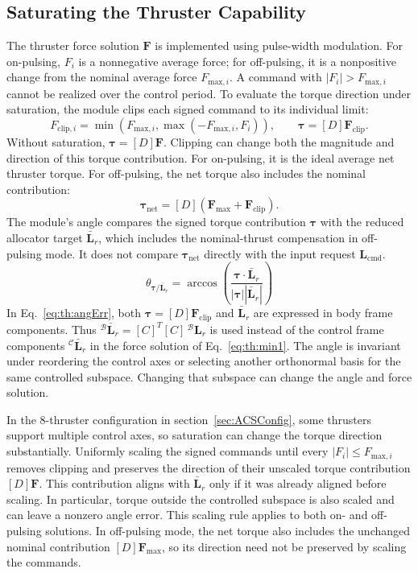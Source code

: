 \subsection{Saturating the Thruster Capability}
The thruster force solution $\bm F$ is implemented using pulse-width modulation.  For on-pulsing, $F_i$ is a nonnegative average force; for off-pulsing, it is a nonpositive change from the nominal average force $F_{\text{max},i}$.  A command with $|F_i| > F_{\text{max},i}$ cannot be realized over the control period.  To evaluate the torque direction under saturation, the module clips each signed command to its individual limit:
\begin{equation*}
	F_{\text{clip},i} = \min\left(F_{\text{max},i}, \max\left(-F_{\text{max},i}, F_i\right)\right),
	\qquad \bm\tau = [D]\bm F_{\text{clip}}.
\end{equation*}
Without saturation, $\bm\tau = [D]\bm F$.  Clipping can change both the magnitude and direction of this torque contribution.  For on-pulsing, it is the ideal average net thruster torque.  For off-pulsing, the net torque also includes the nominal contribution:
\begin{equation*}
	\bm\tau_{\text{net}} = [D](\bm F_{\text{max}} + \bm F_{\text{clip}}).
\end{equation*}
The module's angle compares the signed torque contribution $\bm\tau$ with the reduced allocator target $\bar{\bm L}_r$, which includes the nominal-thrust compensation in off-pulsing mode.  It does not compare $\bm\tau_{\text{net}}$ directly with the input request $\bm L_{\text{cmd}}$.
\begin{equation}
	\label{eq:th:angErr}
	\theta_{\bm\tau/\bar{\bm L}_{r}} = \arccos \left( \frac{\bm\tau \cdot \bar{\bm L}_{r}}{|\bm\tau| |\bar{\bm L}_{r}|} \right)
\end{equation}
In Eq.~\eqref{eq:th:angErr}, both $\bm\tau = [D]\bm F_{\text{clip}}$ and $\bar{\bm L}_{r}$ are expressed in body frame components.  Thus ${}^{\mathcal{B}}\bar{\bm L}_{r} = [C]^{T}[C]\,{}^{\mathcal{B}}\bm L_{r}$ is used instead of the control frame components ${}^{\mathcal{C}}\bar{\bm L}_{r}$ in the force solution of Eq.~\eqref{eq:th:min1}.  The angle is invariant under reordering the control axes or selecting another orthonormal basis for the same controlled subspace.  Changing that subspace can change the angle and force solution.

In the 8-thruster configuration in section~\ref{sec:ACSConfig}, some thrusters support multiple control axes, so saturation can change the torque direction substantially.  Uniformly scaling the signed commands until every $|F_i| \le F_{\text{max},i}$ removes clipping and preserves the direction of their unscaled torque contribution $[D]\bm F$.  This contribution aligns with $\bar{\bm L}_r$ only if it was already aligned before scaling.  In particular, torque outside the controlled subspace is also scaled and can leave a nonzero angle error.  This scaling rule applies to both on- and off-pulsing solutions.  In off-pulsing mode, the net torque also includes the unchanged nominal contribution $[D]\bm F_{\text{max}}$, so its direction need not be preserved by scaling the commands.

